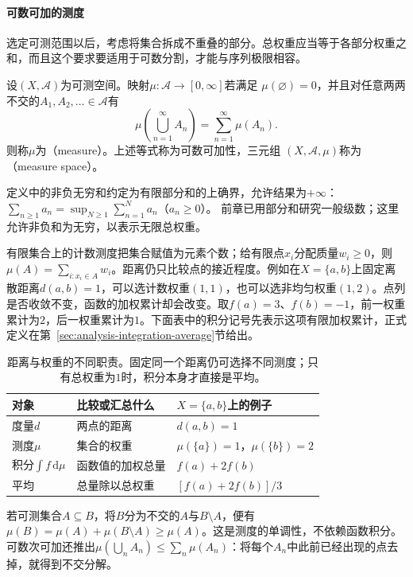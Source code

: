 \paragraph{可数可加的测度}

选定可测范围以后，考虑将集合拆成不重叠的部分。总权重应当等于各部分权重之和，而且这个要求要适用于可数分割，才能与序列极限相容。

\begin{definition}[测度与测度空间]
\label{def:analysis-measure-space}
设$(X,\mathcal{A})$为可测空间。映射$\mu:\mathcal{A}\to[0,\infty]$若满足
$\mu(\varnothing)=0$，并且对任意两两不交的$A_1,A_2,\ldots\in\mathcal{A}$有
\[   \mu\left(\bigcup_{n=1}^{\infty}A_n\right)   =   \sum_{n=1}^{\infty}\mu(A_n). \]
则称$\mu$为（measure）。上述等式称为可数可加性，三元组
$(X,\mathcal{A},\mu)$称为（measure space）。
\end{definition}
定义中的非负无穷和约定为有限部分和的上确界，允许结果为$+\infty$：
$\sum_{n\geq1}a_n=\sup_{N\geq1}\sum_{n=1}^N a_n$（$a_n\geq0$）。
前章已用部分和研究一般级数；这里允许非负和为无穷，以表示无限总权重。

有限集合上的计数测度把集合赋值为元素个数；给有限点$x_i$分配质量$w_i\geq0$，则$\mu(A)=\sum_{i:x_i\in A}w_i$。距离仍只比较点的接近程度。例如在$X=\{a,b\}$上固定离散距离$d(a,b)=1$，可以选计数权重$(1,1)$，也可以选非均匀权重$(1,2)$。点列是否收敛不变，函数的加权累计却会改变。取$f(a)=3$、$f(b)=-1$，前一权重累计为$2$，后一权重累计为$1$。下面表中的积分记号先表示这项有限加权累计，正式定义在第~\ref{sec:analysis-integration-average}节给出。

\begin{table}[htbp]
 \centering\small
 \begin{tabularx}{\linewidth}{@{}lXX@{}}
 \toprule
 对象 & 比较或汇总什么 & $X=\{a,b\}$上的例子\\
 \midrule
 度量$d$ & 两点的距离 & $d(a,b)=1$\\
 测度$\mu$ & 集合的权重 & $\mu(\{a\})=1$，$\mu(\{b\})=2$\\
 积分$\int f\,\mathrm d\mu$ & 函数值的加权总量 & $f(a)+2f(b)$\\
 平均 & 总量除以总权重 & $[f(a)+2f(b)]/3$\\
 \bottomrule
 \end{tabularx}
 \caption{距离与权重的不同职责。固定同一个距离仍可选择不同测度；只有总权重为$1$时，积分本身才直接是平均。}
 \label{tab:analysis-metric-measure-integral}
\end{table}

若可测集合$A\subseteq B$，将$B$分为不交的$A$与$B\setminus A$，便有$\mu(B)=\mu(A)+\mu(B\setminus A)\geq\mu(A)$。这是测度的单调性，不依赖函数积分。可数次可加还推出$\mu(\bigcup_n A_n)\leq\sum_n\mu(A_n)$：将每个$A_n$中此前已经出现的点去掉，就得到不交分解。

